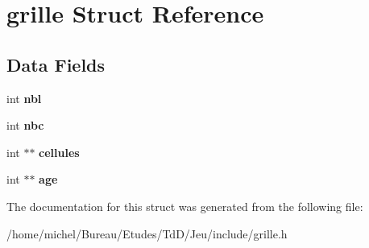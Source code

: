 \hypertarget{structgrille}{}\section{grille Struct Reference}
\label{structgrille}
\subsection*{Data Fields}
\begin{DoxyCompactItemize}
\item 
int {\bfseries nbl}\hypertarget{structgrille_acf98b2c5c1a51e021aad6633fd2c41c6}{}\label{structgrille_acf98b2c5c1a51e021aad6633fd2c41c6}

\item 
int {\bfseries nbc}\hypertarget{structgrille_a965672cdeaba5c5352e804c1ac4bdb91}{}\label{structgrille_a965672cdeaba5c5352e804c1ac4bdb91}

\item 
int $\ast$$\ast$ {\bfseries cellules}\hypertarget{structgrille_a008dfdfef8fc75a738819f5329ee57a7}{}\label{structgrille_a008dfdfef8fc75a738819f5329ee57a7}

\item 
int $\ast$$\ast$ {\bfseries age}\hypertarget{structgrille_a256bc9d79754d92d761b1c0343b1397c}{}\label{structgrille_a256bc9d79754d92d761b1c0343b1397c}

\end{DoxyCompactItemize}


The documentation for this struct was generated from the following file\+:\begin{DoxyCompactItemize}
\item 
/home/michel/\+Bureau/\+Etudes/\+Td\+D/\+Jeu/include/grille.\+h\end{DoxyCompactItemize}

